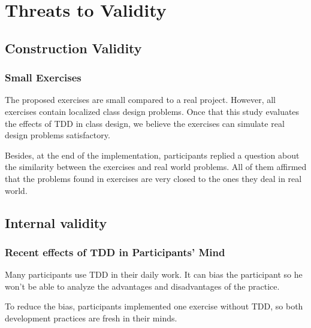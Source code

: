 \documentclass[conference]{IEEEtran}
\begin{document}
\section{Threats to Validity}
\label{cap:ameacas}

\subsection{Construction Validity}

\subsubsection{Small Exercises}

The proposed exercises are small compared to a real project. However, all exercises
contain localized class design problems. Once that this study evaluates the effects
of TDD in class design, we believe the exercises can simulate real design problems
satisfactory.

Besides, at the end of the implementation, participants replied a question about the
similarity between the exercises and real world problems. All of them affirmed that
the problems found in exercises are very closed to the ones they deal in real world.

\subsection{Internal validity}

\subsubsection{Recent effects of TDD in Participants' Mind}

Many participants use TDD in their daily work. It can bias the participant so he
won't be able to analyze the advantages and disadvantages of the practice.

To reduce the bias, participants implemented one exercise without TDD, so both
development practices are fresh in their minds.

\end{document}
